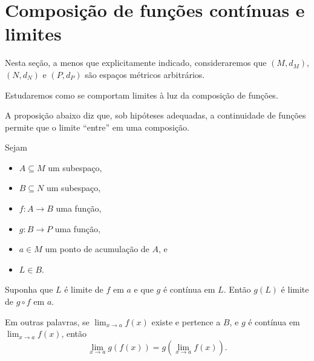 \section{Composição de funções contínuas e limites}

Nesta seção, a menos que explicitamente indicado, consideraremos que $(M, d_M)$, $(N, d_N)$ e $(P, d_P)$ são espaços métricos arbitrários.

Estudaremos como se comportam limites à luz da composição de funções.

A proposição abaixo diz que, sob hipóteses adequadas, a continuidade de funções permite que o limite ``entre'' em uma composição.

\begin{proposition}\label{prop:composicaoLimites}
    Sejam
    \begin{itemize}
        \item $A\subseteq M$ um subespaço,
        \item $B\subseteq N$ um subespaço,
        \item $f: A \to B$ uma função,
        \item $g: B \to P$ uma função,
        \item $a \in M$ um ponto de acumulação de $A$, e
        \item $L\in B$.
    \end{itemize}

    Suponha que $L$ é limite de $f$ em $a$ e que $g$ é contínua em $L$.
    Então $g(L)$ é limite de $g\circ f$ em $a$.

    Em outras palavras, se $\lim_{x\to a} f(x)$ existe e pertence a $B$, e $g$ é contínua em $\lim_{x\to a} f(x)$, então
    \[
        \lim_{x\to a} g(f(x)) = g\left(\lim_{x\to a} f(x)\right).
    \]
\end{proposition}

